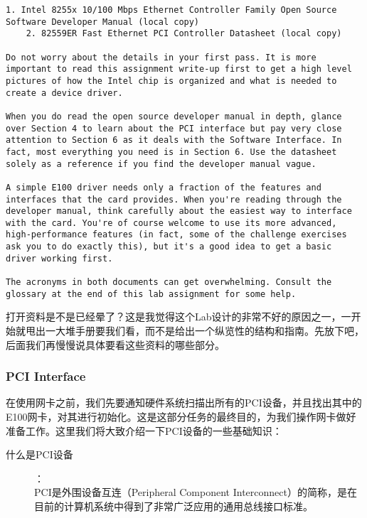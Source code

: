 \documentclass{article}
\begin{document}
\begin{CJK*}{UTF8}{gkai}
\begin{lstlisting}[style=exercise]
    1. Intel 8255x 10/100 Mbps Ethernet Controller Family Open Source Software Developer Manual (local copy)
    2. 82559ER Fast Ethernet PCI Controller Datasheet (local copy)

Do not worry about the details in your first pass. It is more important to read this assignment write-up first to get a high level pictures of how the Intel chip is organized and what is needed to create a device driver.

When you do read the open source developer manual in depth, glance over Section 4 to learn about the PCI interface but pay very close attention to Section 6 as it deals with the Software Interface. In fact, most everything you need is in Section 6. Use the datasheet solely as a reference if you find the developer manual vague.

A simple E100 driver needs only a fraction of the features and interfaces that the card provides. When you're reading through the developer manual, think carefully about the easiest way to interface with the card. You're of course welcome to use its more advanced, high-performance features (in fact, some of the challenge exercises ask you to do exactly this), but it's a good idea to get a basic driver working first.

The acronyms in both documents can get overwhelming. Consult the glossary at the end of this lab assignment for some help.
\end{lstlisting}


打开资料是不是已经晕了？这是我觉得这个Lab设计的非常不好的原因之一，一开始就甩出一大堆手册要我们看，而不是给出一个纵览性的结构和指南。先放下吧，后面我们再慢慢说具体要看这些资料的哪些部分。


\subsubsection{PCI Interface}

在使用网卡之前，我们先要通知硬件系统扫描出所有的PCI设备，并且找出其中的E100网卡，对其进行初始化。这是这部分任务的最终目的，为我们操作网卡做好准备工作。这里我们将大致介绍一下PCI设备的一些基础知识：

\begin{description}
\item[什么是PCI设备]：\\

PCI是外围设备互连（Peripheral Component Interconnect）的简称，是在目前的计算机系统中得到了非常广泛应用的通用总线接口标准。


\end{description}
\end{CJK*}
\end{document}
